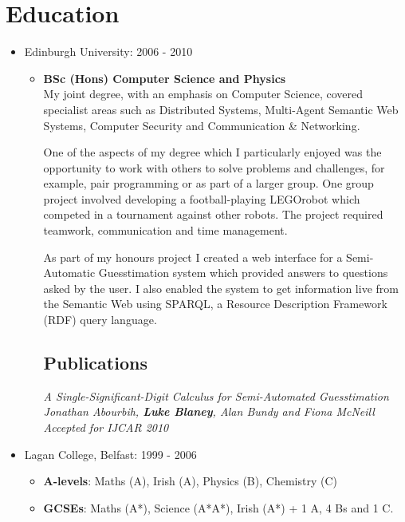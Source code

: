 \documentclass[a4paper]{article}
\begin{document}
\section*{Education}
\begin{itemize}

\item Edinburgh University: 2006 - 2010 \begin{itemize}\item {\bf BSc (Hons) Computer Science and Physics}\\
My joint degree, with an emphasis on Computer Science, covered specialist areas such as Distributed Systems, Multi-Agent Semantic Web Systems, Computer Security and Communication \& Networking.

One of the aspects of my degree which I particularly enjoyed was the opportunity to work with others to solve problems and challenges, for example, pair programming or as part of a larger group.  One group project involved developing a football-playing LEGO\textregistered robot which competed in a tournament against other robots.  The project required teamwork, communication and time management.  

As part of my honours project I created a web interface for a Semi-Automatic Guesstimation system which provided answers to questions asked by the user.   I also enabled the system to get information live from the Semantic Web using SPARQL, a Resource Description Framework (RDF) query language.
\subsection*{Publications}
\em A Single-Significant-Digit Calculus for Semi-Automated Guesstimation \em\\
Jonathan Abourbih, {\bf Luke Blaney}, Alan Bundy and Fiona McNeill\\
Accepted for IJCAR 2010
\end{itemize}

\item Lagan College, Belfast: 1999 - 2006
\begin{itemize}\item {\bf A-levels}: Maths (A), Irish (A), Physics (B), Chemistry (C)
\item {\bf GCSEs}: Maths (A*), Science (A*A*), Irish (A*) + 1 A, 4 Bs and 1 C.

\end{itemize}

\end{itemize}
\end{document}
